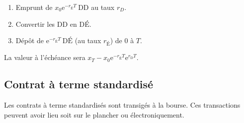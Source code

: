 \documentclass[10pt, french]{article}
\begin{document}
\begin{multicols*}{2}
\begin{definitionNOHFILL}
\begin{enumerate}[label	=	\circled{\arabic*}{trueblue}]
	\item	Emprunt de $x_{0} \textrm{e}^{-r_{\text{É}}T}\ \text{DD}$ au taux $r_{D}$.
	\item 	Convertir les DD en DÉ.
	\item	Dépôt de $\textrm{e}^{-r_{\text{É}}T}\ \text{DÉ}$ (au taux $r_{\text{É}}$) de 0 à $T$.
\end{enumerate}

La valeur à l'échéance sera $x_{T} - x_{0} \textrm{e}^{-r_{\text{É}}T} \textrm{e}^{r_{\text{D}}T}$.
\end{definitionNOHFILL}

\columnbreak

\subsection{Contrat à terme standardisé}

Les contrats à terme standardisés sont transigés à la bourse. Ces transactions peuvent avoir lieu soit sur le plancher ou électroniquement.


\end{multicols*}
\end{document}
